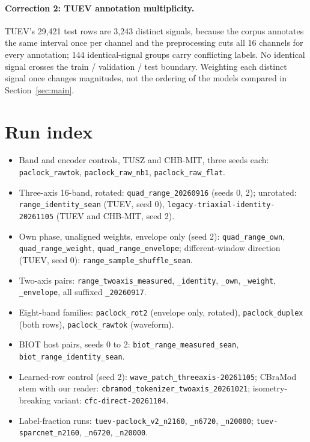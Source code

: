 \paragraph{Correction 2: TUEV annotation multiplicity.}
TUEV's 29,421 test rows are 3,243 distinct signals, because the corpus annotates the same interval once per channel and the preprocessing cuts all 16 channels for every annotation; 144 identical-signal groups carry conflicting labels. No identical signal crosses the train / validation / test boundary. Weighting each distinct signal once changes magnitudes, not the ordering of the models compared in Section~\ref{sec:main}.

\section{Run index}
\label{sec:runs}
\begin{itemize}\raggedright
\item Band and encoder controls, TUSZ and CHB-MIT, three seeds each: \texttt{paclock\_rawtok}, \texttt{paclock\_raw\_nb1}, \texttt{paclock\_raw\_flat}.
\item Three-axis 16-band, rotated: \texttt{quad\_range\_20260916} (seeds 0, 2); unrotated: \texttt{range\_identity\_sean} (TUEV, seed 0), \texttt{legacy-triaxial-identity-20261105} (TUEV and CHB-MIT, seed 2).
\item Own phase, unaligned weights, envelope only (seed 2): \texttt{quad\_range\_own}, \texttt{quad\_range\_weight}, \texttt{quad\_range\_envelope}; different-window direction (TUEV, seed 0): \texttt{range\_sample\_shuffle\_sean}.
\item Two-axis pairs: \texttt{range\_twoaxis\_measured}, \texttt{\_identity}, \texttt{\_own}, \texttt{\_weight}, \texttt{\_envelope}, all suffixed \texttt{\_20260917}.
\item Eight-band families: \texttt{paclock\_rot2} (envelope only, rotated), \texttt{paclock\_duplex} (both rows), \texttt{paclock\_rawtok} (waveform).
\item BIOT host pairs, seeds 0 to 2: \texttt{biot\_range\_measured\_sean}, \texttt{biot\_range\_identity\_sean}.
\item Learned-row control (seed 2): \texttt{wave\_patch\_threeaxis-20261105}; CBraMod stem with our reader: \texttt{cbramod\_tokenizer\_twoaxis\_20261021}; isometry-breaking variant: \texttt{cfc-direct-20261104}.
\item Label-fraction runs: \texttt{tuev-paclock\_v2\_n2160}, \texttt{\_n6720}, \texttt{\_n20000}; \texttt{tuev-sparcnet\_n2160}, \texttt{\_n6720}, \texttt{\_n20000}.
\end{itemize}

